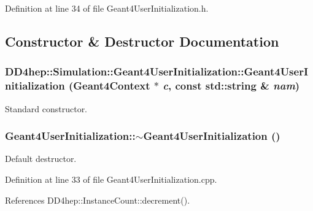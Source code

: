 Definition at line 34 of file Geant4UserInitialization.h.

\subsection{Constructor \& Destructor Documentation}
\hypertarget{class_d_d4hep_1_1_simulation_1_1_geant4_user_initialization_a247daa1d57d180bb14b7a46187cf0e27}{
\subsubsection[{Geant4UserInitialization}]{\setlength{\rightskip}{0pt plus 5cm}DD4hep::Simulation::Geant4UserInitialization::Geant4UserInitialization ({\bf Geant4Context} $\ast$ {\em c}, \/  const std::string \& {\em nam})}}
\label{class_d_d4hep_1_1_simulation_1_1_geant4_user_initialization_a247daa1d57d180bb14b7a46187cf0e27}


Standard constructor. \hypertarget{class_d_d4hep_1_1_simulation_1_1_geant4_user_initialization_af2367d3c7707179e2809f9a94b42bf00}{
\subsubsection[{$\sim$Geant4UserInitialization}]{\setlength{\rightskip}{0pt plus 5cm}Geant4UserInitialization::$\sim$Geant4UserInitialization ()}}
\label{class_d_d4hep_1_1_simulation_1_1_geant4_user_initialization_af2367d3c7707179e2809f9a94b42bf00}


Default destructor. 

Definition at line 33 of file Geant4UserInitialization.cpp.

References DD4hep::InstanceCount::decrement().


